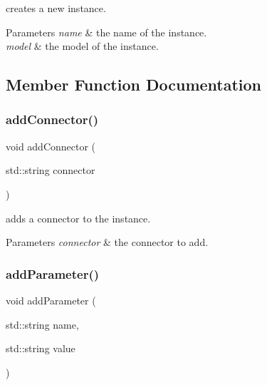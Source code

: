 creates a new instance. 


\begin{DoxyParams}{Parameters}
{\em name} & the name of the instance. \\
\hline
{\em model} & the model of the instance. \\
\hline
\end{DoxyParams}


\subsection{Member Function Documentation}
\mbox{\label{class_s_p_i_c_e_1_1_instance_af9aeca34e780851a2b024df7c5ff5b54}} 
\subsubsection{\texorpdfstring{add\+Connector()}{addConnector()}}
{\footnotesize\ttfamily void add\+Connector (\begin{DoxyParamCaption}\item[{std\+::string}]{connector }\end{DoxyParamCaption})\hspace{0.3cm}{\ttfamily [inline]}}



adds a connector to the instance. 


\begin{DoxyParams}{Parameters}
{\em connector} & the connector to add. \\
\hline
\end{DoxyParams}
\mbox{\label{class_s_p_i_c_e_1_1_instance_a8d69bbbea5ece0949e100c464e412f20}} 
\subsubsection{\texorpdfstring{add\+Parameter()}{addParameter()}}
{\footnotesize\ttfamily void add\+Parameter (\begin{DoxyParamCaption}\item[{std\+::string}]{name,  }\item[{std\+::string}]{value }\end{DoxyParamCaption})}




